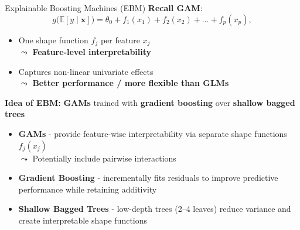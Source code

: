 \documentclass[11pt,compress,t,notes=noshow, aspectratio=169, xcolor=table]{beamer}
\begin{document}
\begin{frame}{Explainable Boosting Machines (EBM) }
\textbf{Recall GAM}: 
$$
g\big(\mathbb{E}[y \mid \mathbf{x}]\big) = \theta_0 + f_1(x_{1}) + f_2(x_{2}) + \ldots + f_p(x_{p}),
$$

\begin{itemize}
    \item One shape function $f_j$ per feature $x_j$\\ $\leadsto$ \textbf{Feature-level interpretability}
    \item Captures non-linear univariate effects\\ $\leadsto$ \textbf{Better performance / more flexible than GLMs}
\end{itemize}

\medskip

\textbf{Idea of EBM:} \textbf{GAMs} trained with \textbf{gradient boosting} over \textbf{shallow bagged trees}
\begin{itemize}
    \item \textbf{GAMs} - provide feature-wise interpretability via separate shape functions $f_j(x_j)$\\
    $\leadsto$ Potentially include pairwise interactions
    \item \textbf{Gradient Boosting} - incrementally fits residuals to improve predictive performance while retaining additivity
    \item \textbf{Shallow Bagged Trees} - low-depth trees (2–4 leaves) reduce variance and create interpretable shape functions
\end{itemize}



\end{frame}
\end{document}
